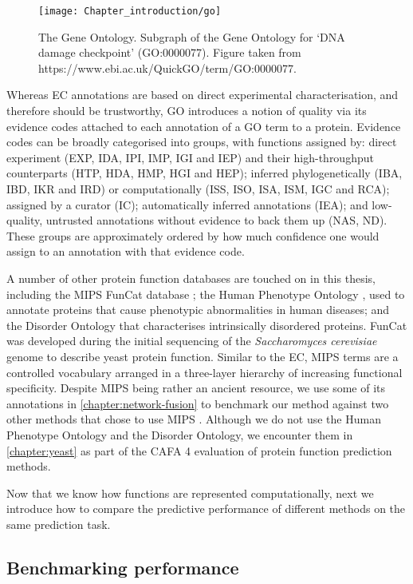 \begin{figure}[!hbt]
    \centering
    \texttt{[image: Chapter\_introduction/go]}
    \caption{%
        The Gene Ontology.
        Subgraph of the Gene Ontology for `DNA damage checkpoint' (GO:0000077).
        Figure taken from https://www.ebi.ac.uk/QuickGO/term/GO:0000077.
    }
    \label{fig:go}
\end{figure}

Whereas EC annotations are based on direct experimental characterisation, and therefore should be trustworthy, GO introduces a notion of quality via its evidence codes attached to each annotation of a GO term to a protein.
Evidence codes can be broadly categorised into groups, with functions assigned by:
direct experiment (EXP, IDA, IPI, IMP, IGI and IEP) and their high-throughput counterparts (HTP, HDA, HMP, HGI and HEP); 
inferred phylogenetically (IBA, IBD, IKR and IRD) or computationally (ISS, ISO, ISA, ISM, IGC and RCA);
assigned by a curator (IC);
automatically inferred annotations (IEA);
and low-quality, untrusted annotations without evidence to back them up (NAS, ND).
These groups are approximately ordered by how much confidence one would assign to an annotation with that evidence code.

A number of other protein function databases are touched on in this thesis, including the MIPS FunCat database \cite{Pagel2005,Ruepp2004}; the Human Phenotype Ontology \cite{Kohler2019}, used to annotate proteins that cause phenotypic abnormalities in human diseases; and the Disorder Ontology \cite{Hatos2020} that characterises intrinsically disordered proteins.
FunCat was developed during the initial sequencing of the \emph{Saccharomyces cerevisiae} genome to describe yeast protein function.
Similar to the EC, MIPS terms are a controlled vocabulary arranged in a three-layer hierarchy of increasing functional specificity.
Despite MIPS being rather an ancient resource, we use some of its annotations in \ref{chapter:network-fusion} to benchmark our method against two other methods that chose to use MIPS \cite{Cho2016,Gligorijevic2018}.
Although we do not use the Human Phenotype Ontology and the Disorder Ontology, we encounter them in \ref{chapter:yeast} as part of the CAFA 4 evaluation of protein function prediction methods.

Now that we know how functions are represented computationally, next we introduce how to compare the predictive performance of different methods on the same prediction task.

\subsection{Benchmarking performance}

